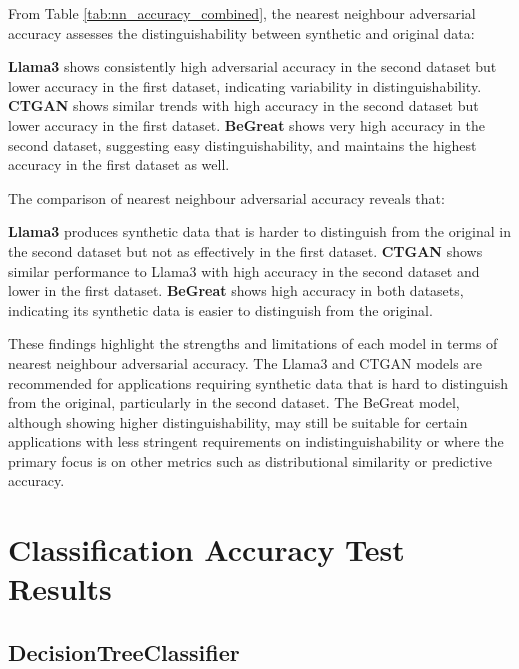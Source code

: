 From Table \ref{tab:nn_accuracy_combined}, the nearest neighbour adversarial accuracy assesses the distinguishability between synthetic and original data:

\textbf{Llama3} shows consistently high adversarial accuracy in the second dataset but lower accuracy in the first dataset, indicating variability in distinguishability.
\textbf{CTGAN} shows similar trends with high accuracy in the second dataset but lower accuracy in the first dataset.
\textbf{BeGreat} shows very high accuracy in the second dataset, suggesting easy distinguishability, and maintains the highest accuracy in the first dataset as well.

\vspace{0.5cm}

The comparison of nearest neighbour adversarial accuracy reveals that:

\textbf{Llama3} produces synthetic data that is harder to distinguish from the original in the second dataset but not as effectively in the first dataset.
\textbf{CTGAN} shows similar performance to Llama3 with high accuracy in the second dataset and lower in the first dataset.
\textbf{BeGreat} shows high accuracy in both datasets, indicating its synthetic data is easier to distinguish from the original.

\vspace{0.5cm}

These findings highlight the strengths and limitations of each model in terms of nearest neighbour adversarial accuracy. The Llama3 and CTGAN models are recommended for applications requiring synthetic data that is hard to distinguish from the original, particularly in the second dataset. The BeGreat model, although showing higher distinguishability, may still be suitable for certain applications with less stringent requirements on indistinguishability or where the primary focus is on other metrics such as distributional similarity or predictive accuracy.




\section{Classification Accuracy Test Results}

\subsection{DecisionTreeClassifier}

